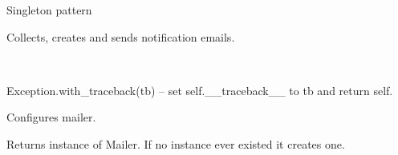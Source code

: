 \documentclass[letterpaper,10pt,english]{sphinxmanual}
\begin{document}
\begin{fulllineitems}
\label{index:spy.Mailer}
Singleton pattern

Collects, creates and sends notification emails.

\begin{fulllineitems}
\label{index:spy.Mailer.NotSingle}~

\begin{fulllineitems}
\label{index:spy.Mailer.NotSingle.args}
\end{fulllineitems}


\begin{fulllineitems}
\label{index:spy.Mailer.NotSingle.with_traceback}
Exception.with\_traceback(tb) --
set self.\_\_traceback\_\_ to tb and return self.

\end{fulllineitems}


\end{fulllineitems}


\begin{fulllineitems}
\label{index:spy.Mailer._Mailer__instance}
\end{fulllineitems}


\begin{fulllineitems}
\label{index:spy.Mailer.configure}
Configures mailer.

\end{fulllineitems}


\begin{fulllineitems}
\label{index:spy.Mailer.get_instance}
Returns instance of Mailer.
If no instance ever existed it creates one.


\end{fulllineitems}
\end{fulllineitems}
\end{document}
